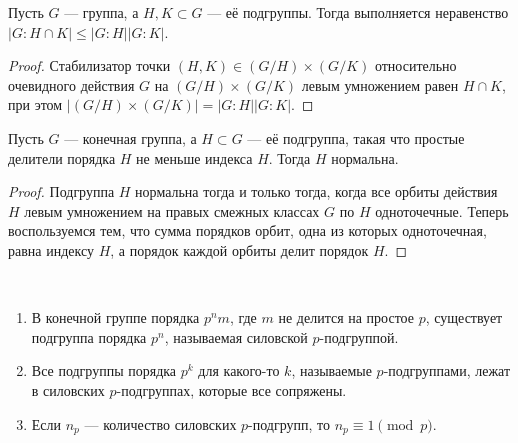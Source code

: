 \documentclass[
	extrafontsizes,
	11pt,
	hyphens,
]{memoir}
\begin{document}
\begin{theorem}
Пусть \(G\) --- группа, а \(H,K \subset G\) --- её подгруппы.
Тогда выполняется неравенство \(\lvert G : H \cap K \rvert \leqslant
\lvert G : H \rvert \lvert G : K \rvert\).
\end{theorem}

\begin{proof}
Стабилизатор точки \((H,K) \in (G/H) \times (G/K)\) относительно очевидного действия \(G\) на \((G/H) \times (G/K)\) левым умножением равен \(H \cap K\),
при этом \(\lvert (G/H) \times (G/K) \rvert = \lvert G : H \rvert \lvert G : K \rvert\).
\end{proof}

\begin{theorem}
Пусть \(G\) --- конечная группа,
а \(H \subset G\) --- её подгруппа, такая что простые делители порядка \(H\) не меньше индекса \(H\).
Тогда \(H\) нормальна.
\end{theorem}

\begin{proof}
Подгруппа \(H\) нормальна тогда и только тогда, когда все орбиты действия \(H\) левым умножением на правых смежных классах \(G\) по \(H\) одноточечные.
Теперь воспользуемся тем, что
сумма порядков орбит, одна из которых одноточечная, равна индексу \(H\), а порядок каждой орбиты делит порядок \(H\).
\end{proof}

\begin{theorem}
~\begin{enumerate}[
	font=\upshape,
	label=\asbuk*),
	ref=\asbuk*,
	]

\item В конечной группе порядка \(p^n m\), где \(m\) не делится на простое \(p\), существует подгруппа порядка \(p^n\), называемая силовской \(p\)-подгруппой.

\item Все подгруппы порядка \(p^k\) для какого-то \(k\), называемые \(p\)-под\-груп\-пами, лежат в силовских \(p\)-подгруппах, которые все сопряжены.
    
\item Если \(n_p\) --- количество силовских \(p\)-подгрупп, то \(n_p \equiv 1 \pmod p\).

\end{enumerate}
\end{theorem}
\end{document}
